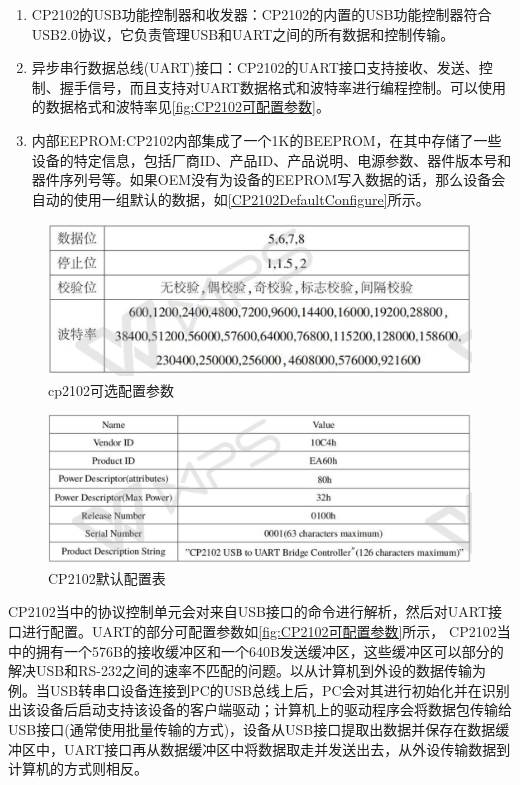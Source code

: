 \begin{enumerate}
\item CP2102的USB功能控制器和收发器：CP2102的内置的USB功能控制器符合USB2.0协议，它负责管理USB和UART之间的所有数据和控制传输。
\item 异步串行数据总线(UART)接口：CP2102的UART接口支持接收、发送、控制、握手信号，而且支持对UART数据格式和波特率进行编程控制。可以使用的数据格式和波特率见\autoref{fig:CP2102可配置参数}。
\item 内部EEPROM:CP2102内部集成了一个1K的BEEPROM，在其中存储了一些设备的特定信息，包括厂商ID、产品ID、产品说明、电源参数、器件版本号和器件序列号等\cite{CP2102}。如果OEM没有为设备的EEPROM写入数据的话，那么设备会自动的使用一组默认的数据，如\autoref{CP2102DefaultConfigure}所示。
\end{enumerate}

\begin{figure}[!h]
\centering
\includegraphics[width=1.0\textwidth]{./graphics/CP2102ChioceConf.pdf}
\caption{cp2102可选配置参数}\label{fig:CP2102可配置参数}
\end{figure}

\begin{figure}[!h]
\centering
\includegraphics[width=1.0\textwidth]{./graphics/CP2102DefConf.pdf}
\caption{CP2102默认配置表}\label{CP2102DefaultConfigure}
\end{figure}

	CP2102当中的协议控制单元会对来自USB接口的命令进行解析，然后对UART接口进行配置。UART的部分可配置参数如\autoref{fig:CP2102可配置参数}所示，
	CP2102当中的拥有一个576B的接收缓冲区和一个640B发送缓冲区，这些缓冲区可以部分的解决USB和RS-232之间的速率不匹配的问题。以从计算机到外设的数据传输为例。当USB转串口设备连接到PC的USB总线上后，PC会对其进行初始化并在识别出该设备后启动支持该设备的客户端驱动；计算机上的驱动程序会将数据包传输给USB接口(通常使用批量传输的方式)，设备从USB接口提取出数据并保存在数据缓冲区中，UART接口再从数据缓冲区中将数据取走并发送出去，从外设传输数据到计算机的方式则相反\cite{李雪红2004USB}。






